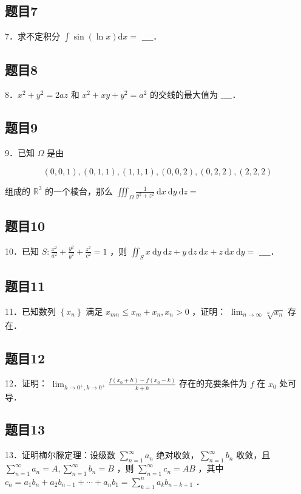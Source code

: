 \documentclass{article}
\begin{document}
\subsection{题目7}
7．求不定积分 \(\int \sin (\ln x) \mathrm{d} x=\) \(\_\_\_\_\)．

\subsection{题目8}
8．\(x^{2}+y^{2}=2 a z\) 和 \(x^{2}+x y+y^{2}=a^{2}\) 的交线的最大值为 \(\_\_\_\_\)．

\subsection{题目9}
9．已知 \(\Omega\) 是由

\[
(0,0,1),(0,1,1),(1,1,1),(0,0,2),(0,2,2),(2,2,2)
\]

组成的 \(\mathbb{R}^{3}\) 的一个棱台，那么 \(\iiint_{\Omega} \frac{1}{y^{2}+z^{2}} \mathrm{~d} x \mathrm{~d} y \mathrm{~d} z=\)

\subsection{题目10}
10．已知 \(S: \frac{x^{2}}{a^{2}}+\frac{y^{2}}{b^{2}}+\frac{z^{2}}{c^{2}}=1\) ，则 \(\iint_{S} x \mathrm{~d} y \mathrm{~d} z+y \mathrm{~d} z \mathrm{~d} x+z \mathrm{~d} x \mathrm{~d} y=\) \(\_\_\_\_\)．

\subsection{题目11}
11．已知数列 \(\left\{x_{n}\right\}\) 满足 \(x_{m n} \leq x_{m}+x_{n}, x_{n}>0\) ，证明： \(\lim _{n \rightarrow \infty} \sqrt[n]{x_{n}}\) 存在．

\subsection{题目12}
12．证明： \(\lim _{h \rightarrow 0^{+}, k \rightarrow 0^{+}} \frac{f\left(x_{0}+h\right)-f\left(x_{0}-k\right)}{k+h}\) 存在的充要条件为 \(f\) 在 \(x_{0}\) 处可导．

\subsection{题目13}
13．证明梅尔滕定理：设级数 \(\sum_{n=1}^{\infty} a_{n}\) 绝对收敛，\(\sum_{n=1}^{\infty} b_{n}\) 收敛，且 \(\sum_{n=1}^{\infty} a_{n}=A, \sum_{n=1}^{\infty} b_{n}=B\) ，则 \(\sum_{n=1}^{\infty} c_{n}=A B\) ，其中 \(c_{n}=a_{1} b_{n}+a_{2} b_{n-1}+\cdots+a_{n} b_{1}=\sum_{k=1}^{n} a_{k} b_{n-k+1}\) ．
\end{document}
